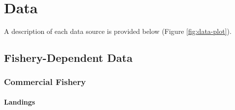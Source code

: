 \documentclass[11pt,
  english,
  a4paper,
]{article}
\begin{document}
\leavevmode\tagmcend\tagstructend\par


\hypertarget{data}{%
\section{Data}\label{data}}

\leavevmode\tagmcend\tagstructend


A description of each data source is provided below (Figure \ref{fig:data-plot}).

\leavevmode\tagmcend\tagstructend\par


\hypertarget{fishery-dependent-data}{%
\subsection{Fishery-Dependent Data}\label{fishery-dependent-data}}

\leavevmode\tagmcend\tagstructend


\hypertarget{commercial-fishery}{%
\subsubsection{Commercial Fishery}\label{commercial-fishery}}

\leavevmode\tagmcend\tagstructend


\hypertarget{landings}{%
\paragraph{Landings}\label{landings}}

\leavevmode\tagmcend\tagstructend

\end{document}
